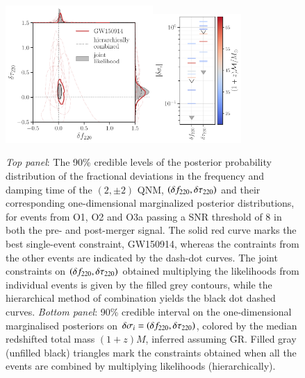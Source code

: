 \begin{figure}
        \includegraphics[width=0.5\textwidth]{figures/rin_pseob_results_v2.pdf}\includegraphics[width=0.3\textwidth]{figures/rin_all_events_bounds.pdf}
        \caption{\emph{Top panel}: The 90\% credible levels of the posterior probability distribution of the fractional deviations in the frequency and damping time of the $(2,\pm 2)$ QNM, $(\delta f_{\text{220}},\delta \tau_{\text{220}})$ and their corresponding one-dimensional marginalized posterior distributions, for events from O1, O2 and O3a passing a SNR threshold of $8$ in both the pre- and post-merger signal. The solid red curve marks the best single-event constraint, GW150914, whereas the contraints from the other events are indicated by the dash-dot curves. The joint constraints on $(\delta f_{\text{220}},\delta \tau_{\text{220}})$ obtained multiplying the likelihoods from individual events is given by the filled grey contours, while the hierarchical method of combination yields the black dot dashed curves. \emph{Bottom panel}: 90\% credible interval on the one-dimensional marginalised posteriors on $\delta \sigma_i=(\delta f_{\text{220}},\delta \tau_{\text{220}})$, colored by the median redshifted total mass $(1 + z)M$, inferred assuming GR. Filled gray (unfilled black) triangles mark the constraints obtained when all the events are combined by multiplying likelihoods (hierarchically).}
        \label{fig:o1o2_events}
\end{figure}

